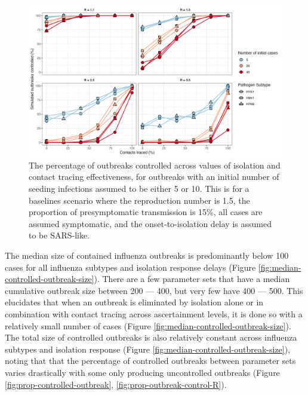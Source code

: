 \documentclass{article}
\begin{document}
\begin{figure}[ht]
\centering
\includegraphics[width=\textwidth]{../plots/prop_outbreak_control_num_init_cases.png}
\caption{The percentage of outbreaks controlled across values of isolation and contact tracing effectiveness, for outbreaks with an initial number of seeding infections assumed to be either 5 or 10. This is for a baselines scenario where the reproduction number is 1.5, the proportion of presymptomatic transmission is 15\%, all cases are assumed symptomatic, and the onset-to-isolation delay is assumed to be SARS-like.}
\label{fig:prop-outbreak-control-num-init-cases}
\end{figure}

\clearpage

The median size of contained influenza outbreaks is predominantly below 100 cases for all influenza subtypes and isolation response delays (Figure \ref{fig:median-controlled-outbreak-size}). There are a few parameter sets that have a median cumulative outbreak size between 200 --- 400, but very few have 400 --- 500. This elucidates that when an outbreak is eliminated by isolation alone or in combination with contact tracing across ascertainment levels, it is done so with a relatively small number of cases (Figure \ref{fig:median-controlled-outbreak-size}). The total size of controlled outbreaks is also relatively constant across influenza subtypes and isolation response (Figure \ref{fig:median-controlled-outbreak-size}), noting that that the percentage of controlled outbreaks between parameter sets varies drastically with some only producing uncontrolled outbreaks (Figure \ref{fig:prop-controlled-outbreak}, \ref{fig:prop-outbreak-control-R}). \\
\end{document}
